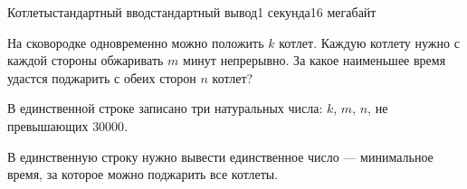 \begin{problem}{Котлеты}{стандартный ввод}{стандартный вывод}{1 секунда}{16 мегабайт}

На сковородке одновременно можно положить $k$ котлет. Каждую котлету нужно с каждой стороны обжаривать $m$ минут непрерывно. За какое наименьшее время удастся поджарить с обеих сторон $n$ котлет?

\InputFile
В единственной строке записано три натуральных числа: $k$, $m$, $n$, не превышающих $30000$.

\OutputFile
В единственную строку нужно вывести единственное число --- минимальное время, за которое можно поджарить все котлеты.

\Examples

\begin{example}
%
%
\end{example}

\end{problem}


